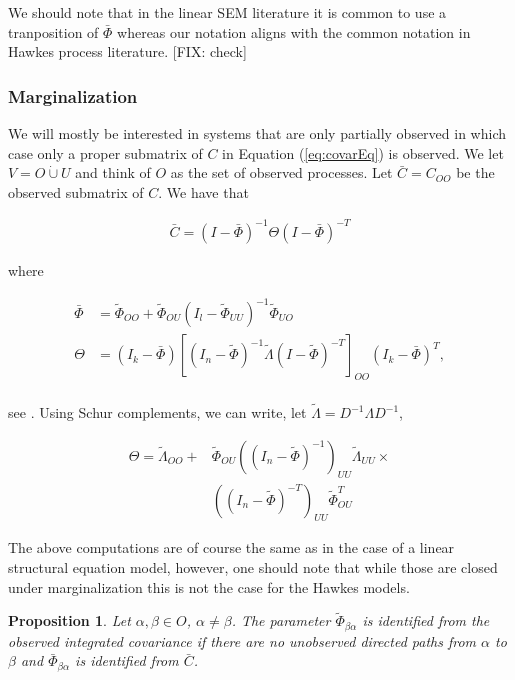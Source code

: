 \documentclass[accepted]{uai2021} %
\newtheorem{prop}[thm]{Proposition}
\newcommand{\disjU}{\mathbin{\dot{\cup}}}
\begin{document}
We should note that in the linear SEM literature it is common to use a 
tranposition of $\bar{\Phi}$ whereas our notation aligns with the common 
notation 
in Hawkes process literature. [FIX: check]


\subsubsection{Marginalization}
\label{sssec:marg}

We will mostly be interested in systems that are only partially observed in 
which case only a proper submatrix of $C$ in Equation (\ref{eq:covarEq}) is 
observed. We let $V = O \disjU 
U$ and think of $O$ as the set of observed processes. Let $\bar{C} = C_{OO}$ be 
the observed submatrix of $C$. We 
have 
that 

\begin{align}
\bar{C} = (I - \bar{\Phi})^{-1}\Theta(I - \bar{\Phi})^{-T}
\end{align}

where 

\begin{align*}
\bar{\Phi} & = \tilde{\Phi}_{OO} +  \tilde{\Phi}_{OU}(I_l - 
\tilde{\Phi}_{UU})^{-1}\tilde{\Phi}_{UO} \\
\Theta & = (I_k-\bar{\Phi})[(I_n - \tilde{\Phi})^{-1}\tilde{\Lambda}(I - 
\tilde{\Phi})^{-T}]_{OO}(I_k-\bar{\Phi})^T, \\
\end{align*}

see \cite{hyttinen2012}. Using Schur complements, we can write, let 
$\tilde{\Lambda} 
= D^{-1}\Lambda D^{-1}$,

\begin{align*}
	\Theta =  \tilde{\Lambda}_{OO} + & \tilde{\Phi}_{OU}((I_n - 
	\tilde{\Phi})^{-1})_{UU}\tilde{\Lambda}_{UU} \times  \\ & ((I_n - 
	\tilde{\Phi})^{-T})_{UU}
	\tilde{\Phi}_{OU}^T
\end{align*}

The above computations are of course the same as in the case of a linear 
structural equation model, however, one should note that while those are closed 
under marginalization this is not the case for the Hawkes models.

\begin{prop}
	Let $\alpha,\beta \in O$, $\alpha\neq \beta$. The parameter 
	$\tilde{\Phi}_{\beta\alpha}$ is 
	identified 
	from the observed integrated covariance if there 
	are no unobserved directed paths from 
	$\alpha$ to $\beta$ and $\bar{\Phi}_{\beta\alpha}$ is identified from 
	$\bar{C}$.
\end{prop}
\end{document}
